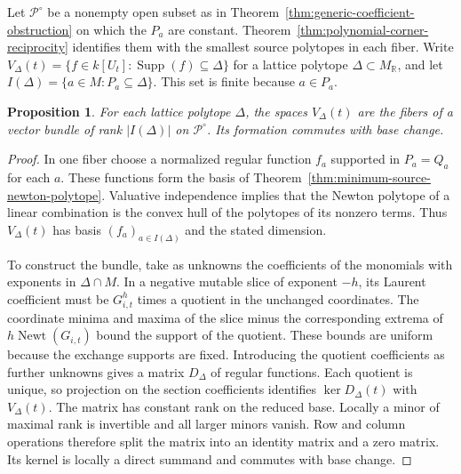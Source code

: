 \documentclass[11pt,reqno]{amsart}
\numberwithin{equation}{section}
\newtheorem{proposition}[theorem]{Proposition}
\theoremstyle{definition}
\theoremstyle{remark}
\DeclareMathOperator{\Newt}{Newt}
\DeclareMathOperator{\Supp}{Supp}
\begin{document}
Let \(\mathcal P^\circ\) be a nonempty open subset as in
Theorem~\ref{thm:generic-coefficient-obstruction} on which the \(P_a\)
are constant. Theorem~\ref{thm:polynomial-corner-reciprocity}
identifies them with the smallest source polytopes in each fiber. Write
\(V_\Delta(t)=\{f\in k[U_t]:\Supp(f)\subseteq\Delta\}\) for a lattice
polytope \(\Delta\subset M_{\mathbb R}\), and let
\(I(\Delta)=\{a\in M:P_a\subseteq\Delta\}\). This set is finite because
\(a\in P_a\).

\begin{proposition}\label{prop:closed-realization-locus}
For each lattice polytope \(\Delta\), the spaces \(V_\Delta(t)\)
are the fibers of a vector bundle of rank \(\lvert I(\Delta)\rvert\)
on \(\mathcal P^\circ\). Its formation commutes with base change.
\end{proposition}
\begin{proof}
In one fiber choose a normalized regular function \(f_a\) supported
in \(P_a=Q_a\) for each \(a\). These functions form the basis of
Theorem~\ref{thm:minimum-source-newton-polytope}. Valuative independence
implies that the Newton polytope of a linear combination is the convex
hull of the polytopes of its nonzero terms. Thus \(V_\Delta(t)\) has
basis \((f_a)_{a\in I(\Delta)}\) and the stated dimension.

To construct the bundle, take as unknowns the coefficients of the
monomials with exponents in \(\Delta\cap M\). In a negative mutable slice
of exponent \(-h\), its Laurent coefficient must be \(G_{i,t}^h\)
times a quotient in the unchanged coordinates. The coordinate minima
and maxima of the slice minus the corresponding extrema of
\(h\Newt(G_{i,t})\) bound the support of the quotient. These bounds
are uniform because the exchange supports are fixed. Introducing the
quotient coefficients as further unknowns gives a matrix \(D_\Delta\)
of regular functions. Each quotient is unique, so projection on the
section coefficients identifies \(\ker D_\Delta(t)\) with \(V_\Delta(t)\).
The matrix has constant rank on the reduced base. Locally a minor
of maximal rank is invertible and all larger minors vanish. Row and
column operations therefore split the matrix into an identity matrix
and a zero matrix. Its kernel is locally a direct summand and commutes
with base change.
\end{proof}
\end{document}
